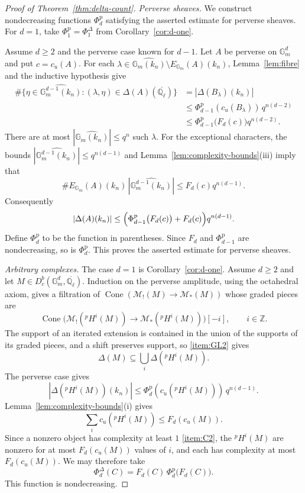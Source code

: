 \documentclass[12pt,reqno]{amsart}
\theoremstyle{definition}
\theoremstyle{plain}
\theoremstyle{definition}
\theoremstyle{remark}
\newcommand{\bbG}{\mathbb{G}}  \newcommand{\bbH}{\mathbb{H}}
\newcommand{\bbQ}{\mathbb{Q}}  \newcommand{\bbR}{\mathbb{R}}
\newcommand{\ol}[1]{\overline{#1}}
\newcommand{\Ql}{\bbQ_{\ell}}
\newcommand{\Db}{D^b_c}
\newcommand{\Gm}{\bbG_m}
\newcommand{\cu}{c_u}
\newcommand{\Cone}{\operatorname{Cone}}
\begin{document}
\begin{proof}[Proof of Theorem~\ref{thm:delta-count}]
\emph{Perverse sheaves.}
We construct nondecreasing functions \(\Phi^{\mathrm p}_{d}\) satisfying the asserted estimate for
perverse sheaves.  For \(d=1\), take \(\Phi^{\mathrm p}_{1}=\Phi^\Delta_{1}\) from
Corollary~\ref{cor:d-one}.

Assume \(d\ge2\) and the perverse case known for \(d-1\).  Let \(A\) be perverse on \(\Gm^d\) and put
\(c=\cu(A)\).
For each \(\lambda\in\widehat{\Gm(k_n)}\setminus E_{\Gm}(A)(k_n)\), Lemma~\ref{lem:fibre} and the inductive
hypothesis give
\[
\begin{aligned}
 \#\{\eta\in\widehat{\Gm^{d-1}(k_n)}:(\lambda,\eta)\in\Delta(A)(\ol\Ql)\}
 &=|\Delta(B_\lambda)(k_n)|\\
 &\le\Phi^{\mathrm p}_{d-1}(\cu(B_\lambda))\,q^{n(d-2)}\\
 &\le\Phi^{\mathrm p}_{d-1}
       \bigl(F_{d}(c)\bigr)q^{n(d-2)}.
\end{aligned}
\]
There are at most \(|\widehat{\Gm(k_n)}|\le q^n\) such \(\lambda\).  For the exceptional characters, the bounds
\(|\widehat{\Gm^{d-1}(k_n)}|\le q^{n(d-1)}\) and Lemma~\ref{lem:complexity-bounds}(iii) imply that
\[
        \#E_{\Gm}(A)(k_n)\,|\widehat{\Gm^{d-1}(k_n)}|
        \le
        F_{d}(c)q^{n(d-1)}.
\]
Consequently
\[
        |\Delta(A)(k_n)|
        \le
        \Bigl(\Phi^{\mathrm p}_{d-1}\bigl(F_{d}(c)\bigr)
        +F_{d}(c)\Bigr)q^{n(d-1)}.
\]
Define \(\Phi^{\mathrm p}_{d}\) to be the function in parentheses.  Since \(F_{d}\) and
\(\Phi^{\mathrm p}_{d-1}\) are nondecreasing, so is \(\Phi^{\mathrm p}_{d}\).  This proves the
asserted estimate for perverse sheaves.

\emph{Arbitrary complexes.}
The case \(d=1\) is Corollary~\ref{cor:d-one}.  Assume \(d\ge2\) and let
\(M\in\Db(\Gm^d,\ol\Ql)\).  Induction on the perverse amplitude, using the octahedral axiom, gives a
filtration of \(\Cone(\mathscr M_!(M)\to\mathscr M_*(M))\) whose graded pieces are
\[
        \Cone\bigl(\mathscr M_!({}^{p}H^{i}(M))\to\mathscr M_*({}^{p}H^{i}(M))\bigr)[-i],\qquad i\in\mathbb Z .
\]
The support of an iterated extension is contained in the union of the supports of its graded pieces, and a
shift preserves support, so \ref{item:GL2} gives
\[
        \Delta(M)\subseteq\bigcup_{i}\Delta({}^{p}H^{i}(M)).
\]
The perverse case gives
\[
        |\Delta({}^{p}H^{i}(M))(k_n)|
        \le\Phi^{\mathrm p}_{d}(\cu({}^{p}H^{i}(M)))\,q^{n(d-1)} .
\]
Lemma~\ref{lem:complexity-bounds}(i) gives
\[
        \sum_i\cu({}^{p}H^{i}(M))\le F_{d}(\cu(M)).
\]
Since a nonzero object has complexity at least \(1\) \ref{item:C2}, the \({}^{p}H^{i}(M)\)
are nonzero for at most \(F_{d}(\cu(M))\) values of \(i\), and each has complexity at most
\(F_{d}(\cu(M))\).  We may therefore take
\[
        \Phi^\Delta_{d}(C)
        =F_{d}(C)\,
        \Phi^{\mathrm p}_{d}\bigl(F_{d}(C)\bigr).
\]
This function is nondecreasing.
\end{proof}
\end{document}
